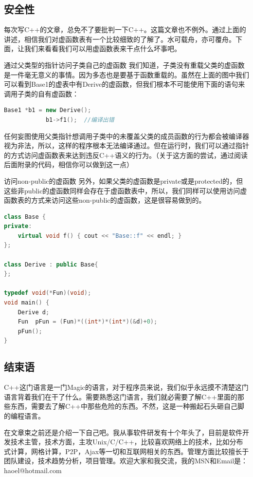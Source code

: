 \documentclass{article}
\begin{document}
\begin{CJK}{UTF8}{gbsn}
\subsection{安全性}
每次写C++的文章，总免不了要批判一下C++。这篇文章也不例外。通过上面的讲述，相信我们对虚函数表有一个比较细致的了解了。水可载舟，亦可覆舟。下面，让我们来看看我们可以用虚函数表来干点什么坏事吧。
\begin{description}
\item{通过父类型的指针访问子类自己的虚函数}
我们知道，子类没有重载父类的虚函数是一件毫无意义的事情。因为多态也是要基于函数重载的。虽然在上面的图中我们可以看到Base1的虚表中有Derive的虚函数，但我们根本不可能使用下面的语句来调用子类的自有虚函数：
\begin{lstlisting}[language=c++] 
          Base1 *b1 = new Derive();
            b1->f1();  //编译出错
 \end{lstlisting}
任何妄图使用父类指针想调用子类中的未覆盖父类的成员函数的行为都会被编译器视为非法，所以，这样的程序根本无法编译通过。但在运行时，我们可以通过指针的方式访问虚函数表来达到违反C++语义的行为。（关于这方面的尝试，通过阅读后面附录的代码，相信你可以做到这一点）
 
\item{访问non-public的虚函数}
另外，如果父类的虚函数是private或是protected的，但这些非public的虚函数同样会存在于虚函数表中，所以，我们同样可以使用访问虚函数表的方式来访问这些non-public的虚函数，这是很容易做到的。
\begin{lstlisting}[language=c++]
class Base {
private:
    virtual void f() { cout << "Base::f" << endl; }
};
 
class Derive : public Base{
};
 
typedef void(*Fun)(void);
void main() {
    Derive d;
    Fun  pFun = (Fun)*((int*)*(int*)(&d)+0);
    pFun();
}
\end{lstlisting}

\subsection{结束语}

C++这门语言是一门Magic的语言，对于程序员来说，我们似乎永远摸不清楚这门语言背着我们在干了什么。需要熟悉这门语言，我们就必需要了解C++里面的那些东西，需要去了解C++中那些危险的东西。不然，这是一种搬起石头砸自己脚的编程语言。
 
在文章束之前还是介绍一下自己吧。我从事软件研发有十个年头了，目前是软件开发技术主管，技术方面，主攻Unix/C/C++，比较喜欢网络上的技术，比如分布式计算，网格计算，P2P，Ajax等一切和互联网相关的东西。管理方面比较擅长于团队建设，技术趋势分析，项目管理。欢迎大家和我交流，我的MSN和Email是：haoel@hotmail.com 


\end{description}
\end{CJK}
\end{document}
